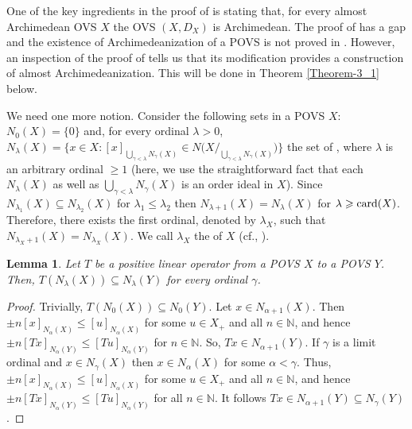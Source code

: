 \documentclass[10pt]{article}
\newtheorem{lemma}{Lemma}[section]
\newcommand{\card}{\hbox{\rm card}}
\renewcommand{\a}{\alpha}
\newcommand{\g}{\gamma}
\begin{document}
One of the key ingredients in the proof of \cite[Theorem 1.1]{E-2017} is \cite[Proposition 3.4]{E-2017}
stating that, for every almost Archimedean OVS $X$ the OVS $(X,D_X)$ is Archimedean.
The proof of \cite[Proposition 3.4]{E-2017} has a gap and the existence of Archimedeanization of a POVS
is not proved in \cite{E-2017}. However, an inspection of the proof of \cite[Theorem 1.1]{E-2017} tells us that 
its modification provides a construction of almost Archimedeanization. This will be done in Theorem \ref{Theorem-3_1} below.

We need one more notion. Consider the following sets in a POVS $X$:\ $N_0(X)=\{0\}$ and, for every ordinal $\lambda>0$,  
$N_{\lambda}(X)=\bigl\{x\in X: [x]_{\bigcup_{{\g}<\lambda}N_{{\g}}(X)}\in N\bigl(X/_{\bigcup_{{\g}<\lambda}N_{{\g}}(X)}\bigl)\bigl\}$ 
the set of {\color{blue}{infinitesimals of $X$ of order $\lambda$}}, 
where $\lambda$ is an arbitrary ordinal $\geqslant 1$ (here, we use the straightforward fact that each $N_{\lambda}(X)$ as well as $\bigcup_{{\g}<\lambda}N_{{\g}}(X)$
is an order ideal in $X$). Since $N_{\lambda_1}(X)\subseteq N_{\lambda_2}(X)$ for $\lambda_1\leqslant\lambda_2$ then 
$N_{\lambda+1}(X)=N_{\lambda}(X)$ for $\lambda\geqslant\card(X)$. Therefore, there exists
the first ordinal, denoted by $\lambda_X$, such that $N_{\lambda_X+1}(X)=N_{\lambda_X}(X)$.
We call $\lambda_X$ the {\color{blue}{almost Archimedeanization type}} of $X$ (cf., \cite{E-2017,E-2023}).

\begin{lemma}\label{Lemma-6}
Let $T$ be a positive linear operator from a POVS $X$ to a POVS $Y$. Then, $T(N_{\lambda}(X))\subseteq N_{\lambda}(Y)$ for every ordinal ${\g}$.
\end{lemma}

\begin{proof}
Trivially, $T(N_{0}(X))\subseteq N_{0}(Y)$.
Let $x\in N_{{\a}+1}(X)$. Then $\pm n[x]_{N_{{\a}}(X)}\leqslant [u]_{N_{{\a}}(X)}$ for some $u\in X_+$ and all $n\in\mathbb{N}$, 
and hence $\pm n[Tx]_{N_{{\a}}(Y)}\leqslant [Tu]_{N_{{\a}}(Y)}$ for $n\in\mathbb{N}$. So, $Tx\in N_{{\a}+1}(Y)$. 
If ${\g}$ is a limit ordinal and $x\in N_{{\g}}(X)$ then $x\in N_{{\a}}(X)$ for some ${\a}<{\g}$. 
Thus, $\pm n[x]_{N_{{\a}}(X)}\leqslant [u]_{N_{{\a}}(X)}$ for some $u\in X_+$ and all $n\in\mathbb{N}$, and hence
$\pm n[Tx]_{N_{{\a}}(Y)}\leqslant [Tu]_{N_{{\a}}(Y)}$ for all $n\in\mathbb{N}$. It follows $Tx\in N_{{\a}+1}(Y)\subseteq N_{{\g}}(Y)$.
\end{proof}
\end{document}
